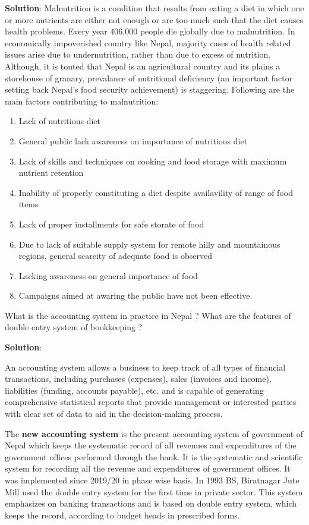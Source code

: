 \documentclass[
]{book}
\newcommand{\question}{\item}
\newenvironment{solution}{ {\bfseries Solution}:}{}
\begin{document}
\begin{questions}
\begin{solution}
Malnutrition is a condition that results from eating a diet in which one or more nutrients are either not enough or are too much such that the diet causes health problems. Every year 406,000 people die globally due to malnutrition. In economically impoverished country like Nepal, majority cases of health related issues arise due to undernutrition, rather than due to excess of nutrition. Although, it is touted that Nepal is an agricultural country and its plains a storehouse of granary, prevalance of nutritional deficiency (an important factor setting back Nepal's food security achievement) is staggering. Following are the main factors contributing to malnutrition:

\begin{enumerate}
\item Lack of nutritious diet
\item General public lack awareness on importance of nutritious diet
\item Lack of skills and techniques on cooking and food storage with maximum nutrient retention
\item Inability of properly constituting a diet despite availavility of range of food items
\item Lack of proper installments for safe storate of food
\item Due to lack of suitable supply system for remote hilly and mountainous regions, general scarcity of adequate food is observed
\item Lacking awareness on general importance of food
\item Campaigns aimed at awaring the public have not been effective.
\end{enumerate}
\end{solution}

\question What is the accounting system in practice in Nepal ? What are the features of double entry system of bookkeeping ?

\begin{solution}

An accounting system allows a business to keep track of all types of financial transactions, including purchases (expenses), sales (invoices and income), liabilities (funding, accounts payable), etc. and is capable of generating comprehensive statistical reports that provide management or interested parties with clear set of data to aid in the decision-making process.

The \textbf{new accounting system} is the present accounting system of government of Nepal which keeps the systematic record of all revenues and expenditures of the government offices performed through the bank. It is the systematic and scientific system for recording all the revenue and expenditures of government offices. It was implemented since 2019/20 in phase wise basis. In 1993 BS, Biratnagar Jute Mill used the double entry system for the first time in private sector. This system emphasizes on banking transactions and is based on double entry system, which keeps the record, according to budget heads in prescribed forms.


\end{solution}
\end{questions}
\end{document}
